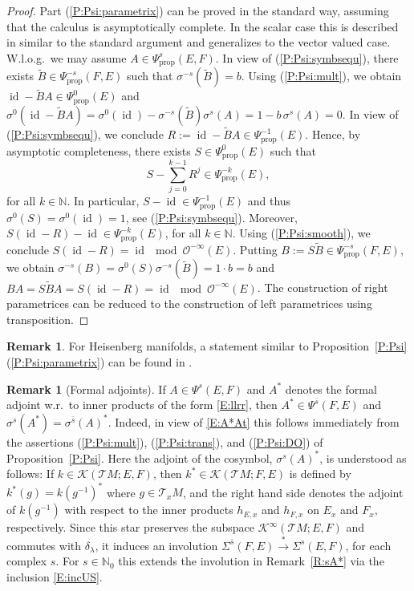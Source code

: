 \documentclass[reqno,12pt]{amsart}
\DeclareMathOperator{\id}{id}
\newcommand\N{\mathbb N}
\newcommand\prop{\textrm{prop}}
\newcommand\itemref[1]{(\ref{#1})}
\theoremstyle{plain}
\theoremstyle{definition}
\newtheorem{remark}[theorem]{Remark}
\begin{document}
\begin{proof}
Part \itemref{P:Psi:parametrix} can be proved in the standard way, assuming that the calculus is asymptotically complete. 
In the scalar case this is described in \cite[Theorem~76]{EY15} similar to the standard argument and generalizes to the vector valued case.
W.l.o.g.\ we may assume $A\in\Psi^s_\prop(E,F)$.
In view of \itemref{P:Psi:symbsequ}, there exists $\tilde B\in\Psi^{-s}_\prop(F,E)$ such that  $\sigma^{-s}(\tilde B)=b$.
Using \itemref{P:Psi:mult}, we obtain $\id-\tilde BA\in\Psi^0_\prop(E)$ and $\sigma^0(\id-\tilde BA)=\sigma^0(\id)-\sigma^{-s}(\tilde B)\sigma^s(A)=1-b\,\sigma^s(A)=0$.
In view of \itemref{P:Psi:symbsequ}, we conclude $R:=\id-\tilde BA\in\Psi^{-1}_\prop(E)$.
Hence, by asymptotic completeness, there exists $S\in\Psi^0_\prop(E)$ such that 
$$
S-\sum_{j=0}^{k-1}R^j\in\Psi^{-k}_\prop(E),
$$
for all $k\in\N$.
In particular, $S-\id\in\Psi^{-1}_\prop(E)$ and thus $\sigma^0(S)=\sigma^0(\id)=1$, see \itemref{P:Psi:symbsequ}.
Moreover, $S(\id-R)-\id\in\Psi^{-k}_\prop(E)$, for all $k\in\N$.
Using \itemref{P:Psi:smooth}, we conclude $S(\id-R)=\id\mod\mathcal O^{-\infty}(E)$.
Putting $B:=S\tilde B\in\Psi^{-s}_\prop(F,E)$, we obtain $\sigma^{-s}(B)=\sigma^0(S)\sigma^{-s}(\tilde B)=1\cdot b=b$ and $BA=S\tilde BA=S(\id-R)=\id\mod\mathcal O^{-\infty}(E)$.
The construction of right parametrices can be reduced to the construction of left parametrices using transposition.
\end{proof}


\begin{remark}
For Heisenberg manifolds, a statement similar to Proposition~\ref{P:Psi}\itemref{P:Psi:parametrix} can be found in \cite[Proposition~3.3.1]{P08}.
\end{remark}


\begin{remark}[Formal adjoints]\label{R:Psi:adjoint}
If $A\in\Psi^s(E,F)$ and $A^*$ denotes the formal adjoint w.r.\ to inner products of the form \eqref{E:llrr}, then $A^*\in\Psi^{\bar s}(F,E)$ and $\sigma^s(A^*)=\sigma^{\bar s}(A)^*$.
Indeed, in view of \eqref{E:A*At} this follows immediately from the assertions \itemref{P:Psi:mult}, \itemref{P:Psi:trans}, and \itemref{P:Psi:DO} of Proposition~\ref{P:Psi}.
Here the adjoint of the cosymbol, $\sigma^s(A)^*$, is understood as follows:
If $k\in\mathcal K(\mathcal TM;E,F)$, then $k^*\in\mathcal K(\mathcal TM;F,E)$ is defined by $k^*(g)=k(g^{-1})^*$ where $g
\in\mathcal T_xM$, and the right hand side denotes the adjoint of $k(g^{-1})$ with respect to the inner products $h_{E,x}$ and $h_{F,x}$ on $E_x$ and $F_x$, respectively.
Since this star preserves the subspace $\mathcal K^\infty(\mathcal TM;E,F)$ and commutes with $\delta_\lambda$, it induces an involution $\Sigma^{\bar s}(F,E)\xrightarrow{*}\Sigma^s(E,F)$, for each complex $s$.
For $s\in\N_0$ this extends the involution in Remark~\ref{R:sA*} via the inclusion \eqref{E:incUS}.
\end{remark}
\end{document}
